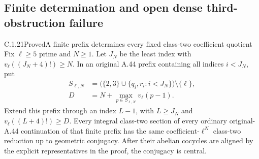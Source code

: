 \subsection{Finite determination and open dense third-obstruction failure}
\label{sec:ghost-prefix-topology}

\begin{result}{C.1.21}{Proved}{A finite prefix determines every fixed class-two coefficient quotient}
\label{lem:ghost-finite-prefix-determines}
Fix \(\ell\ge5\) prime and \(N\ge1\). Let
\(J_N\) be the least index with
\(v_\ell((J_N+4)!)\ge N\). In an original A.44
prefix containing all indices \(i<J_N\), put
\[
 \begin{split}
 S_{\ell,N}&=\bigl(\{2,3\}\cup
             \{q_i,r_i:i<J_N\}\bigr)\setminus\{\ell\},\\
 D&=N+\max_{p\in S_{\ell,N}}v_\ell(p-1).
 \end{split}                                         \tag{76}
\]
Extend this prefix through an index \(L-1\), with
\(L\ge J_N\) and \(v_\ell((L+4)!)\ge D\).
Every integral class-two section of every ordinary
original-A.44 continuation of that finite prefix
has the same coefficient-\(\ell^N\) class-two
reduction up to geometric conjugacy. After their
abelian cocycles are aligned by the explicit
representatives in the proof, the conjugacy is
central.
\end{result}
